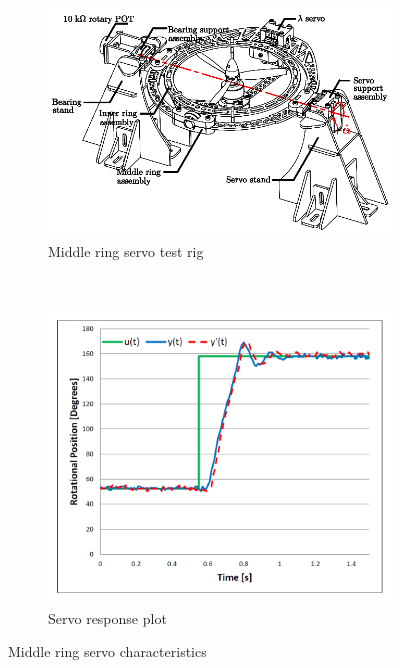 \begin{figure}[hbtp]
\vspace{-4pt}
\centering
\begin{subfigure}{0.75\textwidth}
\centering
\includegraphics[width=\textwidth]{figs/servo-middle}
\vspace{-12pt}
\caption{Middle ring servo test rig}
\label{fig:servo-middle}
\end{subfigure}
\\
\begin{subfigure}{0.49\textwidth}
\centering
\includegraphics[width=\textwidth]{graphs/servo-step-middle}
\vspace{-10pt}
\caption{Servo response plot}
\label{fig:servo-step-middle}
\end{subfigure}
\caption{Middle ring servo characteristics}
\label{fig:servo-middle-character}
\vspace{-28pt}
\end{figure}
